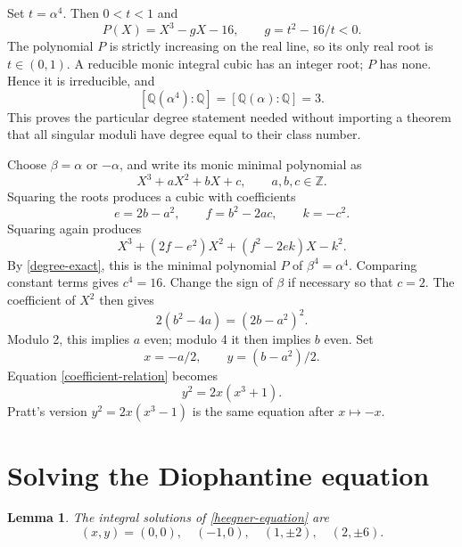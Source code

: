 \documentclass[11pt]{article}
\newtheorem{lemma}[theorem]{Lemma}
\newcommand{\Z}{\mathbb Z}
\newcommand{\Q}{\mathbb Q}
\begin{document}
Set \(t=\alpha^4\). Then \(0<t<1\) and
\[
 P(X)=X^3-gX-16,\qquad g=t^2-16/t<0.
\]
The polynomial \(P\) is strictly increasing on the real line, so its
only real root is \(t\in(0,1)\). A reducible monic integral cubic
has an integer root; \(P\) has none. Hence it is irreducible, and
\begin{equation}\label{degree-exact}
 [\Q(\alpha^4):\Q]=[\Q(\alpha):\Q]=3.
\end{equation}
This proves the particular degree statement needed without importing
a theorem that all singular moduli have degree equal to their class
number.

Choose \(\beta=\alpha\) or \(-\alpha\), and write its monic
minimal polynomial as
\[
 X^3+aX^2+bX+c,\qquad a,b,c\in\Z.
\]
Squaring the roots produces a cubic with coefficients
\[
 e=2b-a^2,\qquad f=b^2-2ac,\qquad k=-c^2.
\]
Squaring again produces
\[
 X^3+(2f-e^2)X^2+(f^2-2ek)X-k^2.
\]
By \eqref{degree-exact}, this is the minimal polynomial \(P\) of
\(\beta^4=\alpha^4\). Comparing constant terms gives \(c^4=16\).
Change the sign of \(\beta\) if necessary so that \(c=2\).
The coefficient of \(X^2\) then gives
\begin{equation}\label{coefficient-relation}
 2(b^2-4a)=(2b-a^2)^2.
\end{equation}
Modulo 2, this implies \(a\) even; modulo 4 it then implies
\(b\) even. Set
\[
 x=-a/2,\qquad y=(b-a^2)/2.
\]
Equation \eqref{coefficient-relation} becomes
\begin{equation}\label{heegner-equation}
 y^2=2x(x^3+1).
\end{equation}
Pratt's version \(y^2=2x(x^3-1)\) is the same equation after
\(x\mapsto-x\).

\section{Solving the Diophantine equation}\label{diophantine}

\begin{lemma}\label{solutions}
The integral solutions of \eqref{heegner-equation} are
\[
 (x,y)=(0,0),\quad(-1,0),\quad(1,\pm2),\quad(2,\pm6).
\]
\end{lemma}
\end{document}
